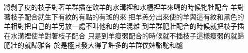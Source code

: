 將剝了皮的枝子\chientien 對著羊群插在飲羊的水溝裡\chientien 和水槽裡\chientien 羊來喝的時候牝牡配合\chuan 
{}羊對著枝子配合\chientien 就生下有紋的\chientien 有點的\chientien 有斑的來\chuan 
{}把羊羔分出來\chientien 使的羊\chientien 與這有紋和黑色的羊相對\chientien 把自己的羊另放一處\chientien 不叫他和的羊混雜\chuan 
{}到羊群肥壯配合的時候\chientien{}就把枝子插在水溝裡\chientien 使羊對著枝子配合\chuan 
{}只是到羊瘦弱配合的時候\chientien 就不插枝子\yuentien 這樣\chientien 瘦弱的就歸\chientien 肥壯的就歸雅各\chuan 
{}於是極其發大\chientien 得了許多的羊群\chientien 僕婢\chientien 駱駝\chientien 和驢\chuan 
